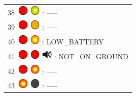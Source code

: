 \documentclass[12pt, a4paper]{report}
\begin{document}
\begin{minipage}{0.45\textwidth}
\begin{Large}
\begin{tabular}{l}
		38\  \includegraphics*[width=5mm]{red_led} \includegraphics*[width=5mm]{green_led_flashing} : -----\\
		
		39\  \includegraphics*[width=5mm]{red_led} \includegraphics*[width=5mm]{orange_led} : -----\\
		
		40\  \includegraphics*[width=5mm]{red_led} \includegraphics*[width=5mm]{orange_led_flashing} : LOW\_BATTERY\\
		
		41\  \includegraphics*[width=5mm]{red_led} \includegraphics*[width=5mm]{red_led} \includegraphics*[width=5mm]{speaker} : NOT\_ON\_GROUND\\
		
		42\  \includegraphics*[width=5mm]{red_led} \includegraphics*[width=5mm]{red_led_flashing} : -----\\
		
		43\  \includegraphics*[width=5mm]{red_led_flashing} \includegraphics*[width=5mm]{off_led} : -----\\
		

\end{tabular}
\end{Large}
\end{minipage}
\end{document}
